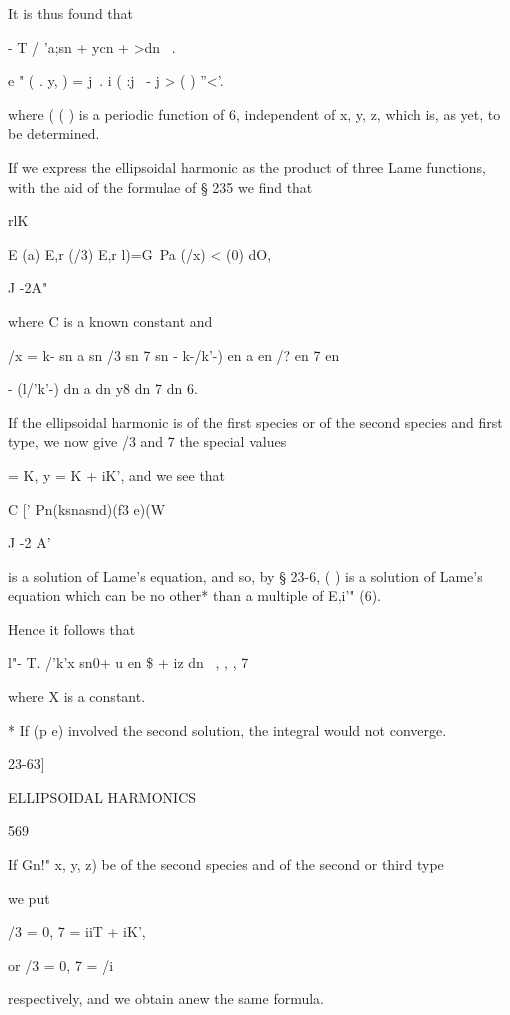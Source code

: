 {{{{{{{{It is thus found that 

 -  T  / 'a;sn  + ycn + >dn \ . 

e " ( . y,  ) = j\  . i   ( :j \ -  j   > ( ) ''<'. 

where (  ( ) is a periodic function of 6, independent of x, y, z, which is, as yet, 
to be determined. 

If we express the ellipsoidal harmonic as the product of three Lame 
functions, with the aid of the formulae of § 235 we find that 



rlK 

E  (a) E,r (/3) E,r  l)=G\ Pa (/x) <  (0) dO, 

J -2A" 

where C is a known constant and 

/x = k- sn a sn /3 sn 7 sn   -  k-/k'-) en a en /? en 7 en 

- (l/'k'-) dn a dn y8 dn 7 dn 6. 

If the ellipsoidal harmonic is of the first species or of the second species 
and first type, we now give /3 and 7 the special values 

  = K, y = K + iK', 
and we see that 

C [' Pn(ksnasnd)(f3 e)(W 

J -2 A' 

is a solution of Lame's equation, and so, by § 23-6, ( ) is a solution of Lame's 
equation which can be no other* than a multiple of E,i'" (6). 

Hence it follows that 

l"-  T. /'k'x sn0+ u en \$ + iz dn  \   ,  , , 7  

where X is a constant. 

* If (p e) involved the second solution, the integral would not converge. 



23-63] 



ELLIPSOIDAL HARMONICS 



569 



If Gn!"   x, y, z) be of the second species and of the second or third type 

we put 

/3 = 0, 7 = iiT + iK', 

or /3 = 0, 7 = /i 

respectively, and we obtain anew the same formula. 

}}}}}}}}

